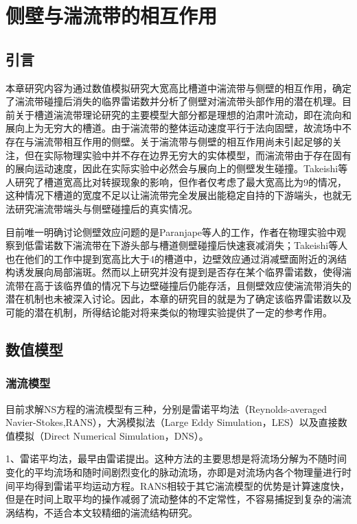 \chapter{侧壁与湍流带的相互作用}
\section{引言}
本章研究内容为通过数值模拟研究大宽高比槽道中湍流带与侧壁的相互作用，确定了湍流带碰撞后消失的临界雷诺数并分析了侧壁对湍流带头部作用的潜在机理。目前关于槽道湍流带理论研究的主要模型大部分都是理想的泊肃叶流动，即在流向和展向上为无穷大的槽道。由于湍流带的整体运动速度平行于法向固壁，故流场中不存在与湍流带相互作用的侧壁。关于湍流带与侧壁的相互作用尚未引起足够的关注，但在实际物理实验中并不存在边界无穷大的实体模型，而湍流带由于存在固有的展向运动速度，因此在实际实验中必然会与展向上的侧壁发生碰撞。Takeishi等人研究了槽道宽高比对转捩现象的影响\cite{Takeishi2015}，但作者仅考虑了最大宽高比为9的情况，这种情况下槽道的宽度不足以让湍流带完全发展出能稳定自持的下游端头，也就无法研究湍流带端头与侧壁碰撞后的真实情况。

目前唯一明确讨论侧壁效应问题的是Paranjape等人的工作\cite{Paranjape2019}，作者在物理实验中观察到低雷诺数下湍流带在下游头部与槽道侧壁碰撞后快速衰减消失；Takeishi等人也在他们的工作中提到宽高比大于4的槽道中，边壁效应通过消减壁面附近的涡结构诱发展向局部湍斑\cite{Takeishi2015}。然而以上研究并没有提到是否存在某个临界雷诺数，使得湍流带在高于该临界值的情况下与边壁碰撞后仍能存活，且侧壁效应使湍流带消失的潜在机制也未被深入讨论。因此，本章的研究目的就是为了确定该临界雷诺数以及可能的潜在机制，所得结论能对将来类似的物理实验提供了一定的参考作用。

\section{数值模型}
\subsection{湍流模型}
目前求解NS方程的湍流模型有三种，分别是雷诺平均法（Reynolds-averaged Navier-Stokes,RANS），大涡模拟法（Large Eddy Simulation，LES）以及直接数值模拟（Direct Numerical Simulation，DNS）。

1、雷诺平均法，最早由雷诺提出。这种方法的主要思想是将流场分解为不随时间变化的平均流场和随时间剧烈变化的脉动流场，亦即是对流场内各个物理量进行时间平均得到雷诺平均运动方程。RANS相较于其它湍流模型的优势是计算速度快，但是在时间上取平均的操作减弱了流动整体的不定常性，不容易捕捉到复杂的湍流涡结构，不适合本文较精细的湍流结构研究。

